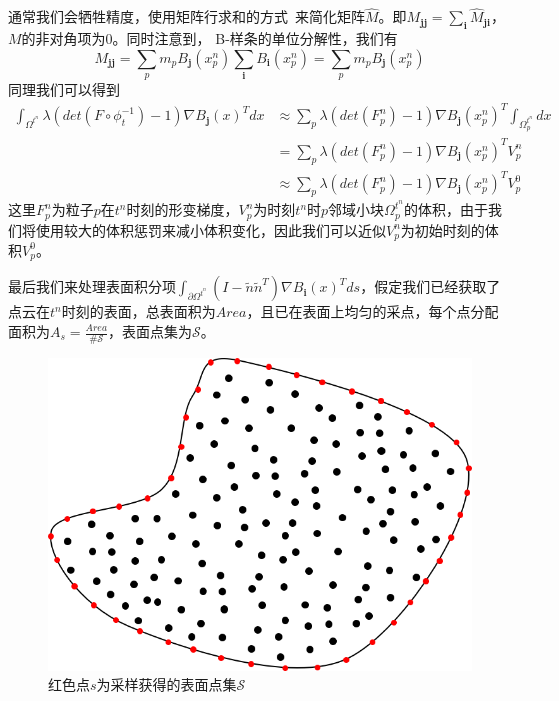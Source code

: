 通常我们会牺牲精度，使用矩阵行求和的方式~\cite{de2020material}来简化矩阵$\hat{M}$。即$M_{\mathbf{jj}} = \sum_{\mathbf{i}}\hat{M}_{\mathbf{ji}}$，$M$的非对角项为0。同时注意到，
B-样条的单位分解性，我们有
$$M_{\mathbf{jj}} = \sum_p m_p B_{\mathbf{j}}(x_p^n)\sum_\mathbf{i}B_\mathbf{i}(x_p^n) = \sum_p m_p B_{\mathbf{j}}(x_p^n)$$
同理我们可以得到
\begin{align}
    \int_{\Omega^{t^n}}\lambda (det(F\circ \phi_t^{-1}) - 1)\nabla B_{\mathbf{j}}(x)^Tdx &\approx \sum_p \lambda (det(F_p^n) - 1)\nabla B_{\mathbf{j}}(x_p^n)^T\int_{\Omega^{t^n}_p}dx \nonumber\\
    & = \sum_p \lambda (det(F_p^n) - 1)\nabla B_{\mathbf{j}}(x_p^n)^T V_p^n\nonumber \\
    & \approx \sum_p \lambda (det(F_p^n) - 1)\nabla B_{\mathbf{j}}(x_p^n)^T V_p^0\nonumber     
\end{align}
这里$F_p^n$为粒子$p$在$t^n$时刻的形变梯度，$V_p^n$为时刻$t^n$时$p$邻域小块$\Omega_p^{t^n}$的体积，由于我们将使用较大的体积惩罚来减小体积变化，因此我们可以近似$V_p^n$为初始时刻的体积$V_p^0$。

最后我们来处理表面积分项$\int_{\partial \Omega^{t^n}} (I - \tilde{n}\tilde{n}^T)\nabla B_{\mathbf{i}}(x)^T ds$，假定我们已经获取了点云在$t^n$时刻的表面，总表面积为$Area$，且已在表面上均匀的采点，每个点分配面积为$A_s = \frac{Area}{\#\mathcal{S}}$，表面点集为$\mathcal{S}$。
\begin{figure}[htbp]
    \centering
    \includegraphics[scale=0.4]{./images/image12.png}
    \caption{红色点$s$为采样获得的表面点集$\mathcal{S}$}
    \label{fig: surface of point cloud}
\end{figure}

